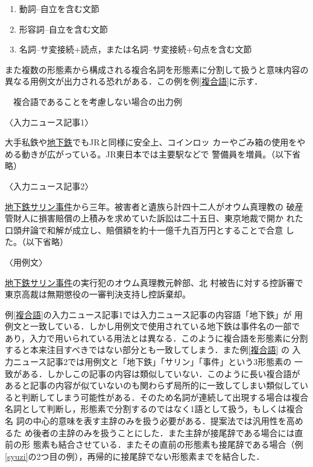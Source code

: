 \documentclass[japanese]{jnlp_1.4}
\newcounter{exp}
\def\exp#1{}
\begin{document}
\begin{enumerate}
 \item   動詞--自立を含む文節
 \item   形容詞--自立を含む文節
 \item   名詞--サ変接続+読点，または名詞--サ変接続+句点を含む文節
\end{enumerate}

また複数の形態素から構成される複合名詞を形態素に分割して扱うと意味内容の
異なる用例文が出力される恐れがある．この例を例\ref{複合語}に示す．

\begin{screen}
\exp{複合語}　複合語であることを考慮しない場合の出力例

〈入力ニュース記事1〉

{\setlength{\leftskip}{2zw}
大手私鉄や\underline{\underline{地下鉄}}でもJRと同様に安全上、コインロッ
カーやごみ箱の使用をやめる動きが広がっている。JR東日本では主要駅などで
警備員を増員。（以下省略）
\par}


〈入力ニュース記事2〉

{\setlength{\leftskip}{2zw}
\ul{地下鉄サリン事件}から三年。被害者と遺族ら計四十二人がオウム真理教の
 破産管財人に損害賠償の上積みを求めていた訴訟は二十五日、東京地裁で開か
 れた口頭弁論で和解が成立し、賠償額を約十一億千九百万円とすることで合意
 した。（以下省略）
\par}

〈用例文〉

{\setlength{\leftskip}{2zw}
\underline{\underline{地下鉄}サリン事件}の実行犯のオウム真理教元幹部、北
 村被告に対する控訴審で東京高裁は無期懲役の一審判決支持し控訴棄却。
\par}
\end{screen}

\noindent
例\ref{複合語}の入力ニュース記事1では入力ニュース記事の内容語「地下鉄」が
用例文と一致している．しかし用例文で使用されている地下鉄は事件名の一部で
あり，入力で用いられている用法とは異なる．このように複合語を形態素に分割
すると本来注目すべきではない部分とも一致してしまう．また例\ref{複合語} の
入力ニュース記事2では用例文と「地下鉄」「サリン」「事件」という3形態素の
一致がある．しかしこの記事の内容は類似していない．このように長い複合語が
あると記事の内容が似ていないのも関わらず局所的に一致してしまい類似してい
ると判断してしまう可能性がある．そのため名詞が連続して出現する場合は複合
名詞として判断し，形態素で分割するのではなく1語として扱う，もしくは複合名
詞の中心的意味を表す主辞のみを扱う必要がある．提案法では汎用性を高めるた
め後者の主辞のみを扱うことにした．また主辞が接尾辞である場合には直前の形
態素も結合させている．またその直前の形態素も接尾辞である場合（例
\ref{syuzi}の2つ目の例），再帰的に接尾辞でない形態素までを結合した．
\end{document}
